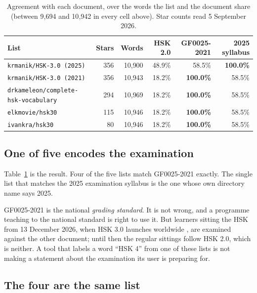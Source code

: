 \documentclass[11pt]{article}
\begin{document}
\begin{table}[t]
\centering\small
\begin{tabular}{@{}lrrrrr@{}}
\toprule
\textbf{List} & \textbf{Stars} & \textbf{Words} & \textbf{HSK 2.0} &
\textbf{GF0025-2021} & \textbf{2025 syllabus} \\
\midrule
\texttt{krmanik/HSK-3.0 (2025)}          & 356 & 10{,}900 & 48.9\% & 58.5\% & \textbf{100.0\%} \\
\texttt{krmanik/HSK-3.0 (2021)}          & 356 & 10{,}943 & 18.2\% & \textbf{100.0\%} & 58.5\% \\
\texttt{drkameleon/complete-hsk-vocabulary} & 294 & 10{,}969 & 18.2\% & \textbf{100.0\%} & 58.5\% \\
\texttt{elkmovie/hsk30}                  & 115 & 10{,}946 & 18.2\% & \textbf{100.0\%} & 58.5\% \\
\texttt{ivankra/hsk30}                   &  80 & 10{,}946 & 18.2\% & \textbf{100.0\%} & 58.5\% \\
\bottomrule
\end{tabular}
\caption{Agreement with each document, over the words the list and the document
share (between 9{,}694 and 10{,}942 in every cell above). Star counts read
5 September 2026.}
\label{tab:audit}
\end{table}

\subsection{One of five encodes the examination}

Table~\ref{tab:audit} is the result. Four of the five lists match GF0025-2021
exactly. The single list that matches the 2025 examination syllabus is the one
whose own directory name says 2025.

GF0025-2021 is the national \emph{grading standard}. It is not wrong, and a
programme teaching to the national standard is right to use it. But learners
sitting the HSK from 13 December 2026, when HSK 3.0 launches worldwide
\citep{smec2026launch}, are examined against the other document; until then the
regular sittings follow HSK 2.0, which is neither. A
tool that labels a word ``HSK 4'' from one of these lists is not making a
statement about the examination its user is preparing for.

\subsection{The four are the same list}
\end{document}
